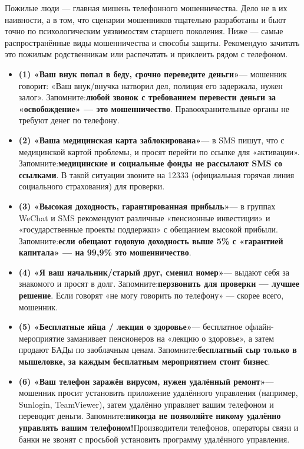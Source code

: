 Пожилые люди — главная мишень телефонного мошенничества. Дело не в их наивности, а в том, что сценарии мошенников тщательно разработаны и бьют точно по психологическим уязвимостям старшего поколения. Ниже — самые распространённые виды мошенничества и способы защиты. Рекомендую зачитать это пожилым родственникам или распечатать и приклеить рядом с телефоном.


\begin{itemize}
  \item \textbf{(1) «Ваш внук попал в беду, срочно переведите деньги»}— мошенник говорит: «Ваш внук/внучка натворил дел, полиция его задержала, нужен залог». Запомните:\textbf{любой звонок с требованием перевести деньги за «освобождение» — это мошенничество}. Правоохранительные органы не требуют денег по телефону.
  \item \textbf{(2) «Ваша медицинская карта заблокирована»}— в SMS пишут, что с медицинской картой проблемы, и просят перейти по ссылке для «активации». Запомните:\textbf{медицинские и социальные фонды не рассылают SMS со ссылками}. В такой ситуации звоните на 12333 (официальная горячая линия социального страхования) для проверки.
  \item \textbf{(3) «Высокая доходность, гарантированная прибыль»}— в группах WeChat и SMS рекомендуют различные «пенсионные инвестиции» и «государственные проекты поддержки» с обещанием высокой прибыли. Запомните:\textbf{если обещают годовую доходность выше 5\% с «гарантией капитала» — на 99,9\% это мошенничество}.
  \item \textbf{(4) «Я ваш начальник/старый друг, сменил номер»}— выдают себя за знакомого и просят в долг. Запомните:\textbf{перзвонить для проверки — лучшее решение}. Если говорят «не могу говорить по телефону» — скорее всего, мошенник.
  \item \textbf{(5) «Бесплатные яйца / лекция о здоровье»}— бесплатное офлайн-мероприятие заманивает пенсионеров на «лекцию о здоровье», а затем продают БАДы по заоблачным ценам. Запомните:\textbf{бесплатный сыр только в мышеловке, за каждым бесплатным мероприятием стоит бизнес}.
  \item \textbf{(6) «Ваш телефон заражён вирусом, нужен удалённый ремонт»}— мошенник просит установить приложение удалённого управления (например, Sunlogin, TeamViewer), затем удалённо управляет вашим телефоном и переводит деньги. Запомните:\textbf{никогда не позволяйте никому удалённо управлять вашим телефоном!}Производители телефонов, операторы связи и банки не звонят с просьбой установить программу удалённого управления.
\end{itemize}

